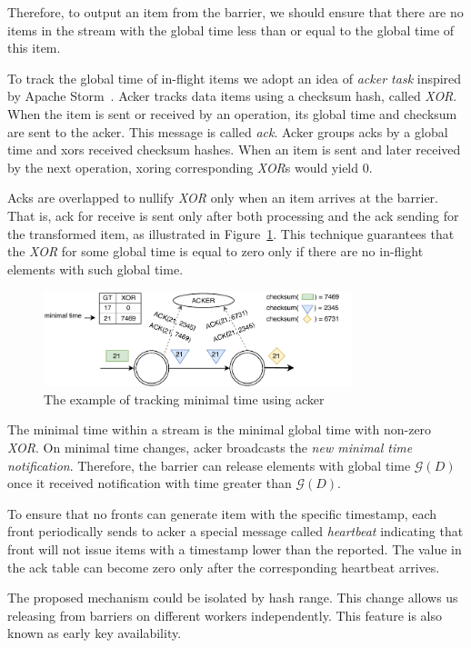 Therefore, to output an item from the barrier, we should ensure that there are no items in the stream with the global time less than or equal to the global time of this item.

To track the global time of in-flight items we adopt an idea of {\it acker task} inspired by Apache Storm~\cite{apache:storm}. Acker tracks data items using a checksum hash, called {\it XOR}. When the item is sent or received by an operation, its global time and checksum are sent to the acker. This message is called {\it ack}.
 Acker groups acks by a global time and xors received checksum hashes. 
When an item is sent and later received by the next operation, xoring corresponding {\it XOR}s would yield 0.

Acks are overlapped to nullify {\it XOR} only when an item arrives at the barrier. That is, ack for receive is sent only after both processing and the ack sending for the transformed item, as illustrated in Figure~\ref{acker}. This technique guarantees that the {\it XOR} for some global time is equal to zero only if there are no in-flight elements with such global time.

\begin{figure}[ht]
  \centering
  \includegraphics[width=0.8\textwidth]{pics/acker}
  \caption{The example of tracking minimal time using acker}
  \label {acker}
\end{figure}

The minimal time within a stream is the minimal global time with non-zero {\it XOR}. On minimal time changes, acker broadcasts the {\it new minimal time notification}. 
Therefore, the barrier can release elements with global time $\mathcal{G} (D)$ 
once it received notification with time greater than $\mathcal{G} (D)$.

To ensure that no fronts can generate item with the specific timestamp, each front periodically sends to acker a special message called {\it heartbeat} indicating that front will not issue items with a timestamp lower than the reported. The value in the ack table can become zero only after the corresponding heartbeat arrives.

The proposed mechanism could be isolated by hash range. This change allows us releasing from barriers on different workers independently. This feature is also known as early key availability.


